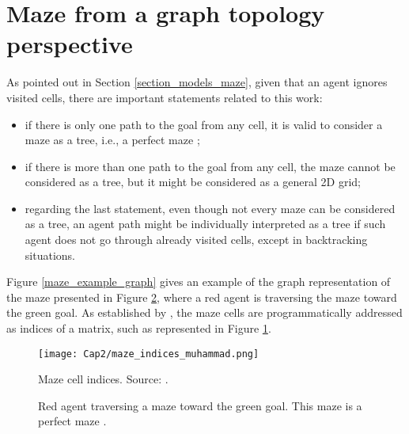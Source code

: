 \section{Maze from a graph topology perspective}
\label{section_models_maze_graph}
As pointed out in Section \ref{section_models_maze}, given that an agent ignores visited cells, there are important statements related to this work:

\begin{itemize}
\item if there is only one path to the goal from any cell, it is valid to consider a maze as a tree, i.e., a perfect maze \cite{Muhammad2021};

\item if there is more than one path to the goal from any cell, the maze cannot be considered as a tree, but it might be considered as a general 2D grid;

\item regarding the last statement, even though not every maze can be considered as a tree, an agent path might be individually interpreted as a tree if such agent does not go through already visited cells, except in backtracking situations.
\end{itemize}

Figure \ref{maze_example_graph} gives an example of the graph representation of the maze presented in Figure \ref{maze_example}, where a red agent is traversing the maze toward the green goal. As established by , the maze cells are programmatically addressed as indices of a matrix, such as represented in Figure \ref{maze_indices_muhammad}.

\begin{figure}[ht!]
\centering
\texttt{[image: Cap2/maze\_indices\_muhammad.png]}
\caption{Maze cell indices. Source: .}
\label{maze_indices_muhammad}
\end{figure}

\begin{figure}
    \centering
    \newline
    \caption{Red agent traversing a maze toward the green goal. This maze is a perfect maze \cite{Muhammad2021}.}
    \label{maze_example}
\end{figure}

